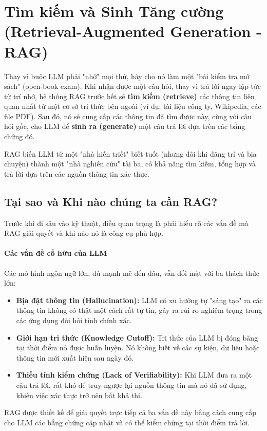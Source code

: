 

\section{Tìm kiếm và Sinh Tăng cường (Retrieval-Augmented Generation - RAG)}
\label{sec:rag}

\begin{tcolorbox}[
    title=Trực giác cốt lõi của RAG,
    colback=yellow!10!white, colframe=yellow!50!black, fonttitle=\bfseries
]
Thay vì buộc LLM phải "nhớ" mọi thứ, hãy cho nó làm một "bài kiểm tra mở sách" (open-book exam). Khi nhận được một câu hỏi, thay vì trả lời ngay lập tức từ trí nhớ, hệ thống RAG trước hết sẽ \textbf{tìm kiếm (retrieve)} các thông tin liên quan nhất từ một cơ sở tri thức bên ngoài (ví dụ: tài liệu công ty, Wikipedia, các file PDF). Sau đó, nó sẽ cung cấp các thông tin đã tìm được này, cùng với câu hỏi gốc, cho LLM để \textbf{sinh ra (generate)} một câu trả lời dựa trên các bằng chứng đó.
\end{tcolorbox}

RAG biến LLM từ một "nhà hiền triết" biết tuốt (nhưng đôi khi đãng trí và bịa chuyện) thành một "nhà nghiên cứu" tài ba, có khả năng tìm kiếm, tổng hợp và trả lời dựa trên các nguồn thông tin xác thực.

\subsection{Tại sao và Khi nào chúng ta cần RAG?}
\label{ssec:why_rag}
Trước khi đi sâu vào kỹ thuật, điều quan trọng là phải hiểu rõ các vấn đề mà RAG giải quyết và khi nào nó là công cụ phù hợp.

\paragraph{Các vấn đề cố hữu của LLM}
Các mô hình ngôn ngữ lớn, dù mạnh mẽ đến đâu, vẫn đối mặt với ba thách thức lớn:
\begin{itemize}
    \item \textbf{Bịa đặt thông tin (Hallucination):} LLM có xu hướng tự "sáng tạo" ra các thông tin không có thật một cách rất tự tin, gây ra rủi ro nghiêm trọng trong các ứng dụng đòi hỏi tính chính xác.
    \item \textbf{Giới hạn tri thức (Knowledge Cutoff):} Tri thức của LLM bị đóng băng tại thời điểm nó được huấn luyện. Nó không biết về các sự kiện, dữ liệu hoặc thông tin mới xuất hiện sau ngày đó.
    \item \textbf{Thiếu tính kiểm chứng (Lack of Verifiability):} Khi LLM đưa ra một câu trả lời, rất khó để truy ngược lại nguồn thông tin mà nó đã sử dụng, khiến việc xác thực trở nên bất khả thi.
\end{itemize}
RAG được thiết kế để giải quyết trực tiếp cả ba vấn đề này bằng cách cung cấp cho LLM các bằng chứng cập nhật và có thể kiểm chứng tại thời điểm trả lời.

